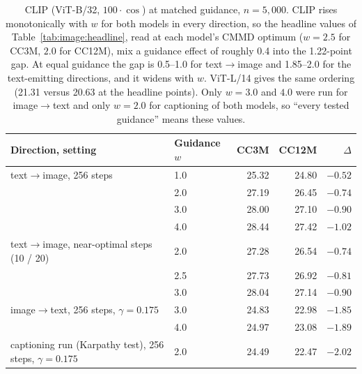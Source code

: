 \begin{table}[tb]
\centering
\small
\setlength{\tabcolsep}{5pt}
\begin{tabular}{llrrr}
\toprule
\textbf{Direction, setting} & \textbf{Guidance $w$} & \textbf{CC3M} & \textbf{CC12M} & $\Delta$ \\
\midrule
text$\rightarrow$image, 256 steps & 1.0 & 25.32 & 24.80 & $-0.52$ \\
 & 2.0 & 27.19 & 26.45 & $-0.74$ \\
 & 3.0 & 28.00 & 27.10 & $-0.90$ \\
 & 4.0 & 28.44 & 27.42 & $-1.02$ \\
text$\rightarrow$image, near-optimal steps (10 / 20) & 2.0 & 27.28 & 26.54 & $-0.74$ \\
 & 2.5 & 27.73 & 26.92 & $-0.81$ \\
 & 3.0 & 28.04 & 27.14 & $-0.90$ \\
\midrule
image$\rightarrow$text, 256 steps, $\gamma{=}0.175$ & 3.0 & 24.83 & 22.98 & $-1.85$ \\
 & 4.0 & 24.97 & 23.08 & $-1.89$ \\
captioning run (Karpathy test), 256 steps, $\gamma{=}0.175$ & 2.0 & 24.49 & 22.47 & $-2.02$ \\
\bottomrule
\end{tabular}
\caption{CLIP (ViT-B/32, $100\cdot\cos$) at matched guidance, $n{=}5{,}000$. CLIP rises
monotonically with $w$ for both models in every direction, so the headline values of
Table~\ref{tab:image:headline}, read at each model's CMMD optimum ($w{=}2.5$ for CC3M, $2.0$ for
CC12M), mix a guidance effect of roughly 0.4 into the 1.22-point gap. At equal guidance the gap is
0.5--1.0 for text$\rightarrow$image and 1.85--2.0 for the text-emitting directions, and it widens
with $w$. ViT-L/14 gives the same ordering (21.31 versus 20.63 at the headline points). Only
$w{=}3.0$ and $4.0$ were run for image$\rightarrow$text and only $w{=}2.0$ for captioning of both
models, so ``every tested guidance'' means these values.}
\label{tab:app:image:matched-clip}
\end{table}

